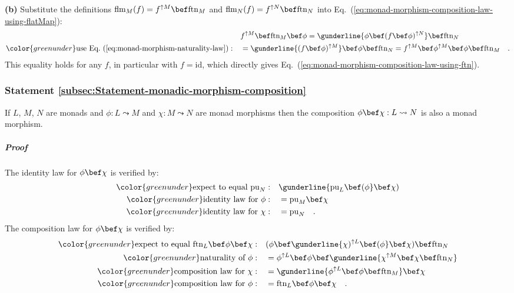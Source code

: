 \textbf{(b)} Substitute the definitions $\text{flm}_{M}(f)=f^{\uparrow M}\bef\text{ftn}_{M}$
and $\text{flm}_{N}(f)=f^{\uparrow N}\bef\text{ftn}_{N}$ into Eq.~(\ref{eq:monad-morphism-composition-law-using-flatMap}):
\begin{align*}
 & f^{\uparrow M}\bef\text{ftn}_{M}\bef\phi=\gunderline{\phi\bef(f\bef\phi)^{\uparrow N}}\bef\text{ftn}_{N}\\
{\color{greenunder}\text{use Eq.~(\ref{eq:monad-morphism-naturality-law})}:}\quad & =\gunderline{(f\bef\phi)^{\uparrow M}}\bef\phi\bef\text{ftn}_{N}=f^{\uparrow M}\bef\phi^{\uparrow M}\bef\phi\bef\text{ftn}_{M}\quad.
\end{align*}
This equality holds for any $f$, in particular with $f=\text{id}$,
which directly gives Eq.~(\ref{eq:monad-morphism-composition-law-using-ftn}).

\subsubsection{Statement \label{subsec:Statement-monadic-morphism-composition}\ref{subsec:Statement-monadic-morphism-composition}}

If $L$, $M$, $N$ are monads and $\phi:L\leadsto M$ and $\chi:M\leadsto N$
are monad morphisms then the composition $\phi\bef\chi:L\leadsto N$
is also a monad morphism.

\subparagraph{Proof}

The identity law for $\phi\bef\chi$ is verified by:
\begin{align*}
{\color{greenunder}\text{expect to equal }\text{pu}_{N}:}\quad & \gunderline{\text{pu}_{L}\bef(\phi}\bef\chi)\\
{\color{greenunder}\text{identity law for }\phi:}\quad & =\text{pu}_{M}\bef\chi\\
{\color{greenunder}\text{identity law for }\chi:}\quad & =\text{pu}_{N}\quad.
\end{align*}
The composition law for $\phi\bef\chi$ is verified by:
\begin{align*}
{\color{greenunder}\text{expect to equal }\text{ftn}_{L}\bef\phi\bef\chi:}\quad & (\phi\bef\gunderline{\chi)^{\uparrow L}\bef(\phi}\bef\chi)\bef\text{ftn}_{N}\\
{\color{greenunder}\text{naturality of }\phi:}\quad & =\phi^{\uparrow L}\bef\phi\bef\gunderline{\chi^{\uparrow M}\bef\chi\bef\text{ftn}_{N}}\\
{\color{greenunder}\text{composition law for }\chi:}\quad & =\gunderline{\phi^{\uparrow L}\bef\phi\bef\text{ftn}_{M}}\bef\chi\\
{\color{greenunder}\text{composition law for }\phi:}\quad & =\text{ftn}_{L}\bef\phi\bef\chi\quad.
\end{align*}


